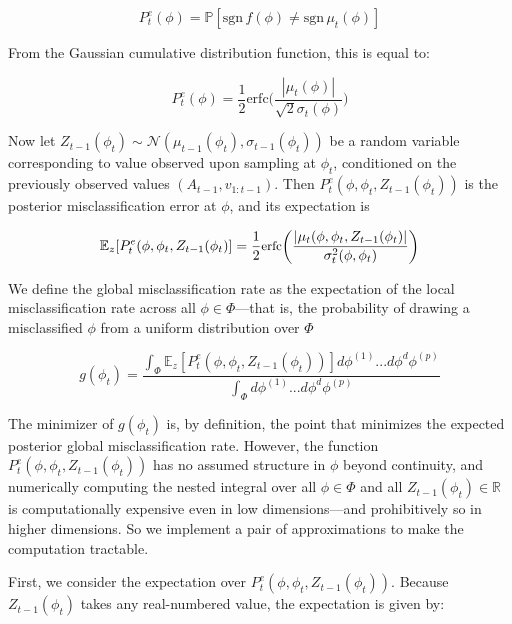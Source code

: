\documentclass{amsart}
\begin{document}
\begin{equation}
    P^e_t (\phi) = \mathbb{P}[\text{sgn}\,f(\phi)\neq \text{sgn}\,\mu_t(\phi)]
\end{equation}

From the Gaussian cumulative distribution function, this is equal to:

\begin{equation}
    P^e_t(\phi) = \frac{1}{2}\text{erfc}\bigg(\frac{|\mu_t(\phi)|}{\sqrt{2}\sigma_t(\phi)}\bigg)
\end{equation}
\smallskip

Now let $Z_{t-1}(\phi_t)\sim\mathcal{N}(\mu_{t-1}(\phi_t),\sigma_{t-1}(\phi_t))$ be a random variable corresponding to value observed upon sampling at $\phi_t$, conditioned on the previously observed values $(A_{t-1},v_{1:t-1})$. Then $P_t^e(\phi,\phi_t,Z_{t-1}(\phi_t))$ is the posterior misclassification error at $\phi$, and its expectation is

\begin{equation}
    \small
    \mathbb{E}_{z}[P_t^e(\phi,\phi_t,Z_{t-1}(\phi_t)] = \frac{1}{2}\text{erfc}\bigg(\frac{|\mu_t(\phi,\phi_t,Z_{t-1}(\phi_t)|}{\sigma_t^2(\phi,\phi_t)}\bigg)
    \label{eq:exprec}
\end{equation}
\smallskip

We define the global misclassification rate as the expectation of the local misclassification rate across all $\phi\in\Phi$---that is, the probability of drawing a misclassified $\phi$ from a uniform distribution over $\Phi$

\begin{equation}
    g(\phi_t) = \frac{\int_\Phi \mathbb{E}_{z}[P_t^e(\phi,\phi_t,Z_{t-1}(\phi_t))] d\phi^{(1)}...d\phi^d\phi^{(p)}}{\int_\Phi d\phi^{(1)}...d\phi^d\phi^{(p)}}
    \label{eq:objfull}
\end{equation}
\smallskip

The minimizer of $g(\phi_t)$ is, by definition, the point that minimizes the expected posterior global misclassification rate. However, the function $P_t^e(\phi,\phi_t,Z_{t-1}(\phi_t))$ has no assumed structure in $\phi$ beyond continuity, and numerically computing the nested integral over all $\phi\in\Phi$ and all $Z_{t-1}(\phi_t)\in\mathbb{R}$ is computationally expensive even in low dimensions---and prohibitively so in higher dimensions. So we implement a pair of approximations to make the computation tractable.

First, we consider the expectation over $P_t^e(\phi,\phi_t,Z_{t-1}(\phi_t))$. Because $Z_{t-1}(\phi_t)$ takes any real-numbered value, the expectation is given by:
\end{document}
